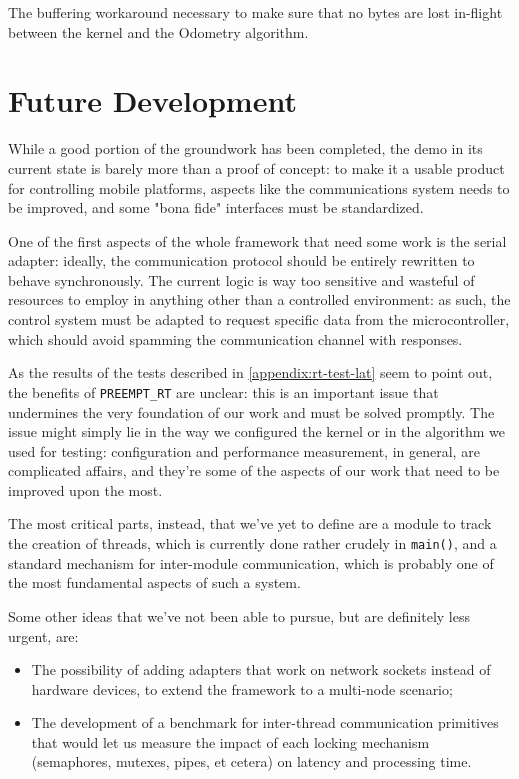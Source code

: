 \documentclass[a4paper,12pt]{report}
\begin{document}
\begin{listing}[H]
\inputminted[frame=single,framesep=10pt]{c}{snippets/otto-buffering.c}
\caption{The buffering workaround necessary to make sure that no bytes are lost in-flight between the kernel and the Odometry algorithm.}
\end{listing}

\section{Future Development}

While a good portion of the groundwork has been completed, the demo in its current state is barely more than a proof of concept: to make it a usable product for controlling mobile platforms, aspects like the communications system needs to be improved, and some "bona fide" interfaces must be standardized.

One of the first aspects of the whole framework that need some work is the serial adapter: ideally, the communication protocol should be entirely rewritten to behave synchronously. The current logic is way too sensitive and wasteful of resources to employ in anything other than a controlled environment: as such, the control system must be adapted to request specific data from the microcontroller, which should avoid spamming the communication channel with responses.

As the results of the tests described in \autoref{appendix:rt-test-lat} seem to point out, the benefits of \texttt{PREEMPT\_RT} are unclear: this is an important issue that undermines the very foundation of our work and must be solved promptly. The issue might simply lie in the way we configured the kernel or in the algorithm we used for testing: configuration and performance measurement, in general, are complicated affairs, and they're some of the aspects of our work that need to be improved upon the most.

The most critical parts, instead, that we've yet to define are a module to track the creation of threads, which is currently done rather crudely in \texttt{main()}, and a standard mechanism for inter-module communication, which is probably one of the most fundamental aspects of such a system.

Some other ideas that we've not been able to pursue, but are definitely less urgent, are:

\begin{itemize}
    \item The possibility of adding adapters that work on network sockets instead of hardware devices, to extend the framework to a multi-node scenario;
    \item The development of a benchmark for inter-thread communication primitives that would let us measure the impact of each locking mechanism (semaphores, mutexes, pipes, et cetera) on latency and processing time.
\end{itemize}
\end{document}
